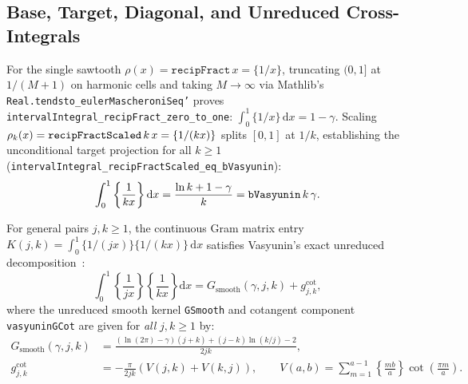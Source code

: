 \documentclass[11pt,a4paper]{article}
\theoremstyle{definition}
\newcommand{\dee}{\mathrm{d}}
\begin{document}
\subsection{Base, Target, Diagonal, and Unreduced Cross-Integrals}

For the single sawtooth $\rho(x) = \texttt{recipFract}\, x = \{1/x\}$, truncating $(0, 1]$ at $1/(M+1)$ on harmonic cells and taking $M \to \infty$ via Mathlib's \texttt{Real.\allowbreak tendsto\_\allowbreak euler\allowbreak Mascheroni\allowbreak Seq'} proves \texttt{interval\allowbreak Integral\_\allowbreak recip\allowbreak Fract\_\allowbreak zero\_\allowbreak to\_\allowbreak one}: $\int_0^1 \{1/x\}\,\dee x = 1 - \gamma$. Scaling $\rho_k(x) = \texttt{recip\allowbreak Fract\allowbreak Scaled}\, k\, x = \{1/(kx)\}$ splits $[0, 1]$ at $1/k$, establishing the unconditional target projection for all $k \ge 1$ (\texttt{interval\allowbreak Integral\_\allowbreak recip\allowbreak Fract\allowbreak Scaled\_\allowbreak eq\_\allowbreak bVasyunin}):
\begin{equation}
\int_0^1 \left\{ \frac{1}{k x} \right\} \dee x = \frac{\ln k + 1 - \gamma}{k} = \text{\texttt{bVasyunin}}\, k\, \gamma.
\end{equation}

For general pairs $j, k \ge 1$, the continuous Gram matrix entry $K(j, k) = \int_0^1 \{1/(jx)\}\{1/(kx)\}\,\dee x$ satisfies Vasyunin's exact unreduced decomposition~\cite{Vasyunin1995}:
\begin{equation}\label{eq:vasyunin_decomposition}
\int_0^1 \left\{ \frac{1}{j x} \right\} \left\{ \frac{1}{k x} \right\} \dee x = G_{\mathrm{smooth}}(\gamma, j, k) + g_{j, k}^{\mathrm{cot}},
\end{equation}
where the unreduced smooth kernel \texttt{GSmooth} and cotangent component \texttt{vasyuninGCot} are given for \emph{all} $j, k \ge 1$ by:
\begin{align}
G_{\mathrm{smooth}}(\gamma, j, k) &= \frac{(\ln(2\pi) - \gamma)(j + k) + (j - k)\ln(k / j) - 2}{2 j k}, \label{eq:gsmooth_unreduced} \\
g_{j, k}^{\mathrm{cot}} &= -\frac{\pi}{2 j k} \left( V(j, k) + V(k, j) \right), \qquad V(a, b) = \sum_{m=1}^{a-1} \left\{ \frac{m b}{a} \right\} \cot\!\left( \frac{\pi m}{a} \right). \label{eq:gcot_unreduced}
\end{align}
\end{document}

